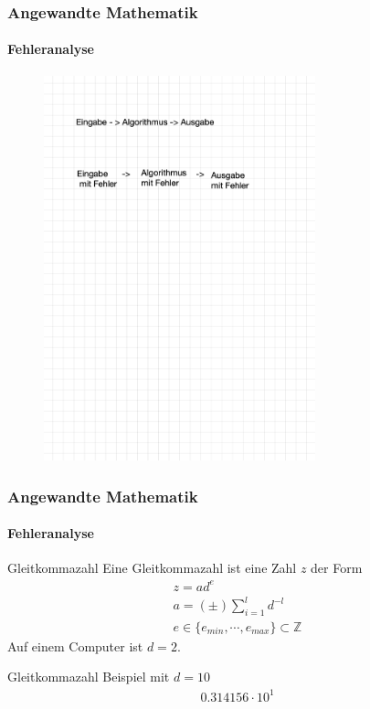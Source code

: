 \documentclass{beamer}
\begin{document}
\begin{frame}
    \frametitle{Angewandte Mathematik}
\framesubtitle{Fehleranalyse}
\begin{figure}[H]
      \centering
    \includegraphics[width=0.7\textwidth]{images/fehler}\end{figure}
 \end{frame}


\begin{frame}
    \frametitle{Angewandte Mathematik}
\framesubtitle{Fehleranalyse}
    \begin{block}{Gleitkommazahl}
Eine Gleitkommazahl ist eine Zahl $z$ der Form
\begin{align*}
z = a d^e \\
a = (\pm) \sum_{i=1}^ld^{-l} \\
e \in \{e_{min}, \cdots , e_{max}  \} \subset \mathbb{Z}
\end{align*}
Auf einem Computer ist $d=2$.
\end{block}

    \begin{block}{Gleitkommazahl}
Beispiel mit  $d= 10$ 
\begin{align*}
0.314156 \cdot 10^1
\end{align*}
\end{block}

 \end{frame}
\end{document}
